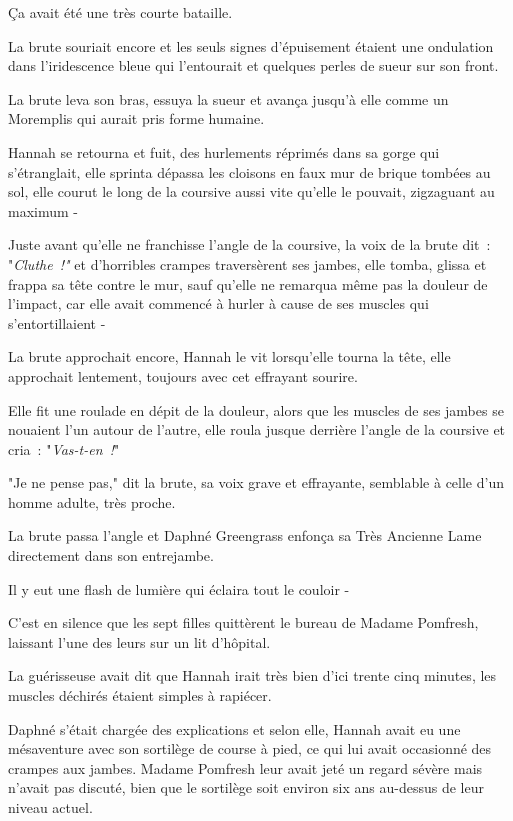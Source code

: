 Ça avait été une très courte bataille.

La brute souriait encore et les seuls signes d'épuisement étaient une ondulation dans l'iridescence bleue qui l'entourait et quelques perles de sueur sur son front.

La brute leva son bras, essuya la sueur et avança jusqu'à elle comme un Moremplis qui aurait pris forme humaine.

Hannah se retourna et fuit, des hurlements réprimés dans sa gorge qui s'étranglait, elle sprinta dépassa les cloisons en faux mur de brique tombées au sol, elle courut le long de la coursive aussi vite qu'elle le pouvait, zigzaguant au maximum -

Juste avant qu'elle ne franchisse l'angle de la coursive, la voix de la brute dit~: "\emph{Cluthe~!"} et d'horribles crampes traversèrent ses jambes, elle tomba, glissa et frappa sa tête contre le mur, sauf qu'elle ne remarqua même pas la douleur de l'impact, car elle avait commencé à hurler à cause de ses muscles qui s'entortillaient -

La brute approchait encore, Hannah le vit lorsqu'elle tourna la tête, elle approchait lentement, toujours avec cet effrayant sourire.

Elle fit une roulade en dépit de la douleur, alors que les muscles de ses jambes se nouaient l'un autour de l'autre, elle roula jusque derrière l'angle de la coursive et cria~: "\emph{Vas-t-en~!}"

"Je ne pense pas," dit la brute, sa voix grave et effrayante, semblable à celle d'un homme adulte, très proche.

La brute passa l'angle et Daphné Greengrass enfonça sa Très Ancienne Lame directement dans son entrejambe.

Il y eut une flash de lumière qui éclaira tout le couloir -

\later

C'est en silence que les sept filles quittèrent le bureau de Madame Pomfresh, laissant l'une des leurs sur un lit d'hôpital.

La guérisseuse avait dit que Hannah irait très bien d'ici trente cinq minutes, les muscles déchirés étaient simples à rapiécer.

Daphné s'était chargée des explications et selon elle, Hannah avait eu une mésaventure avec son sortilège de course à pied, ce qui lui avait occasionné des crampes aux jambes. Madame Pomfresh leur avait jeté un regard sévère mais n'avait pas discuté, bien que le sortilège soit environ six ans au-dessus de leur niveau actuel.

